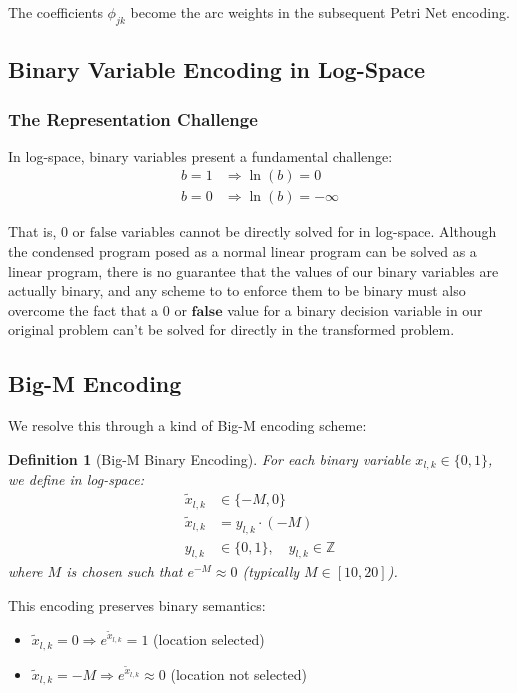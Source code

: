 \documentclass[11pt]{article}
\newtheorem{definition}{Definition}
\newcommand{\Z}{\mathbb{Z}}
\begin{document}
The coefficients $\phi_{jk}$ become the arc weights in the subsequent
Petri Net encoding.

\subsection{Binary Variable Encoding in Log-Space}

\subsubsection{The Representation Challenge}

In log-space, binary variables present a fundamental challenge:
\begin{align}
    b = 1 &\Rightarrow \ln(b) = 0 \\
    b = 0 &\Rightarrow \ln(b) = -\infty
\end{align}

That is, 0 or $\text{false}$ variables cannot be directly solved for
in log-space. Although the condensed program posed as a normal linear
program can be solved as a linear program, there is no guarantee that
the values of our binary variables are actually binary, and any scheme
to to enforce them to be binary must also overcome the fact that a 0
or $\textbf{false}$ value for a binary decision variable in our
original problem can't be solved for directly in the transformed
problem.

\subsection{Big-M Encoding}

We resolve this through a kind of Big-M encoding scheme:

\begin{definition}[Big-M Binary Encoding]
  For each binary variable $x_{l,k} \in \{0,1\}$, we define \emph{in
  log-space}:
  \begin{align}
    \tilde{x}_{l,k} &\in \{-M, 0\} \\
    \tilde{x}_{l,k} &= y_{l,k} \cdot (-M) \\
    y_{l,k} &\in \{0,1\}, \quad y_{l,k} \in \Z
  \end{align}
  where $M$ is chosen such that $e^{-M} \approx 0$ (typically $M \in [10, 20]$).
\end{definition}

This encoding preserves binary semantics:

\begin{itemize}
    \item $\tilde{x}_{l,k} = 0 \Rightarrow e^{\tilde{x}_{l,k}} = 1$ (location selected)
    \item $\tilde{x}_{l,k} = -M \Rightarrow e^{\tilde{x}_{l,k}} \approx 0$ (location not selected)
\end{itemize}
\end{document}
